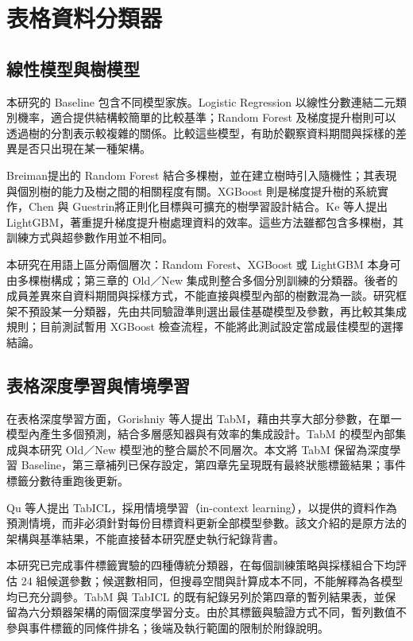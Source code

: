 \section{表格資料分類器}

\subsection{線性模型與樹模型}

本研究的 Baseline 包含不同模型家族。Logistic Regression 以線性分數連結二元類別機率，適合提供結構較簡單的比較基準；Random Forest 及梯度提升樹則可以透過樹的分割表示較複雜的關係。比較這些模型，有助於觀察資料期間與採樣的差異是否只出現在某一種架構。

Breiman\autocite{breiman2001rf}提出的 Random Forest 結合多棵樹，並在建立樹時引入隨機性；其表現與個別樹的能力及樹之間的相關程度有關。XGBoost 則是梯度提升樹的系統實作，Chen 與 Guestrin\autocite{chen2016xgboost}將正則化目標與可擴充的樹學習設計結合。Ke 等人\autocite{ke2017lightgbm}提出 LightGBM，著重提升梯度提升樹處理資料的效率。這些方法雖都包含多棵樹，其訓練方式與超參數作用並不相同。

本研究在用語上區分兩個層次：Random Forest、XGBoost 或 LightGBM 本身可由多棵樹構成；第三章的 Old／New 集成則整合多個分別訓練的分類器。後者的成員差異來自資料期間與採樣方式，不能直接與模型內部的樹數混為一談。研究框架不預設某一分類器，先由共同驗證準則選出最佳基礎模型及參數，再比較其集成規則；目前測試暫用 XGBoost 檢查流程，不能將此測試設定當成最佳模型的選擇結論。

\subsection{表格深度學習與情境學習}

在表格深度學習方面，Gorishniy 等人\autocite{gorishniy2025tabm}提出 TabM，藉由共享大部分參數，在單一模型內產生多個預測，結合多層感知器與有效率的集成設計。TabM 的模型內部集成與本研究 Old／New 模型池的整合屬於不同層次。本文將 TabM 保留為深度學習 Baseline，第三章補列已保存設定，第四章先呈現既有最終狀態標籤結果；事件標籤分數待重跑後更新。

Qu 等人\autocite{qu2025tabicl}提出 TabICL，採用情境學習（in-context learning），以提供的資料作為預測情境，而非必須針對每份目標資料更新全部模型參數。該文介紹的是原方法的架構與基準結果，不能直接替本研究歷史執行紀錄背書。

本研究已完成事件標籤實驗的四種傳統分類器，在每個訓練策略與採樣組合下均評估 24 組候選參數；候選數相同，但搜尋空間與計算成本不同，不能解釋為各模型均已充分調參。TabM 與 TabICL 的既有紀錄另列於第四章的暫列結果表，並保留為六分類器架構的兩個深度學習分支。由於其標籤與驗證方式不同，暫列數值不參與事件標籤的同條件排名；後端及執行範圍的限制於附錄說明。

